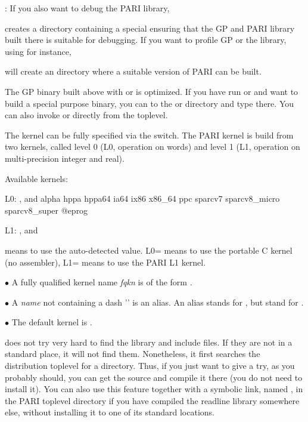 : If you also want to debug the PARI library,


\noindent creates a directory  containing a special
 ensuring that the GP and PARI library built there is
suitable for debugging. If you want to
profile GP or the library, using  for instance,


\noindent will create an  directory where a suitable version
of PARI can be built.

The GP binary built above with  or  is optimized.
If you have run  or  and want to build a special
purpose binary, you can  to the  or  directory
and type  there. You can also invoke  or
 directly from the toplevel.

 The kernel can be fully specified via the
 switch. The PARI kernel is build from two kernels,
called level 0 (L0, operation on words) and level 1 (L1, operation on
multi-precision integer and real).

\noindent Available kernels:

L0: ,  and
\bprog
  alpha hppa hppa64 ia64 ix86 x86_64 ppc sparcv7 sparcv8_micro sparcv8_super
@eprog

L1: ,  and 

\noindent {} means to use the auto-detected value. L0= means
to use the portable C kernel (no assembler), L1= means to use the
PARI L1 kernel. 

\noindent$\bullet$ A fully qualified kernel name \emph{fqkn} is of the form
.

\noindent$\bullet$ A \emph{name} not containing a dash '\kbd{-}' is an alias.
An alias stands for , but  stand for
.

\noindent$\bullet$ The default kernel is .

 does not try very hard to find the  library and
include files. If they are not in a standard place, it will not find them.
Nonetheless, it first searches the distribution toplevel for a 
directory. Thus, if you just want to give  a try, as you
probably should, you can get the source and compile it there (you do not need
to install it). You can also use this feature together with a symbolic link,
named , in the PARI toplevel directory if you have compiled the
readline library somewhere else, without installing it to one of its standard
locations. 

